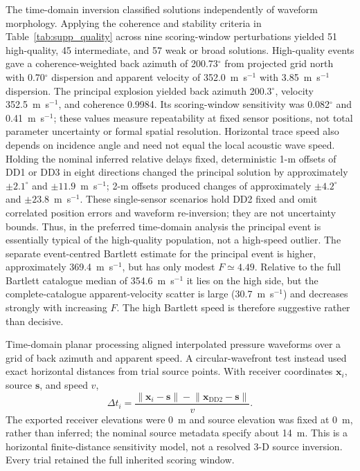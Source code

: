 \documentclass[]{seismica}
\begin{document}
The time-domain inversion classified solutions independently of waveform
morphology. Applying the coherence and stability criteria in
Table~\ref{tab:supp_quality} across nine scoring-window perturbations yielded
51 high-quality, 45 intermediate, and 57 weak or broad solutions. High-quality events gave a
coherence-weighted back azimuth of 200.73$^\circ$ from projected grid north with 0.70$^\circ$
dispersion and apparent velocity of 352.0~m~s$^{-1}$ with
3.85~m~s$^{-1}$ dispersion. The principal explosion yielded back azimuth
200.3$^\circ$, velocity 352.5~m~s$^{-1}$, and coherence 0.9984. Its scoring-window sensitivity was 0.082$^\circ$ and 0.41~m~s$^{-1}$; these values
measure repeatability at fixed sensor positions, not total parameter uncertainty
or formal spatial resolution. Horizontal trace speed also depends on
incidence angle and need not equal the local acoustic wave speed. Holding the nominal inferred relative delays
fixed, deterministic 1-m offsets of DD1 or DD3 in eight directions changed
the principal solution by approximately $\pm2.1^\circ$ and $\pm11.9$~m~s$^{-1}$;
2-m offsets produced changes of approximately $\pm4.2^\circ$ and
$\pm23.8$~m~s$^{-1}$. These single-sensor scenarios hold DD2 fixed and omit
correlated position errors and waveform re-inversion; they are not uncertainty
bounds. Thus, in the preferred
time-domain analysis the principal event is essentially typical of the
high-quality population, not a high-speed outlier.
The separate event-centred Bartlett estimate for the principal event is
higher, approximately 369.4~m~s$^{-1}$, but has only modest $F\simeq4.49$.
Relative to the full Bartlett catalogue median of 354.6~m~s$^{-1}$ it lies on
the high side, but the complete-catalogue apparent-velocity scatter is large
(30.7~m~s$^{-1}$) and decreases strongly with increasing $F$. The high Bartlett
speed is therefore suggestive rather than decisive.

Time-domain planar processing aligned interpolated pressure waveforms over a
grid of back azimuth and apparent speed. A circular-wavefront test instead
used exact horizontal distances from trial source points. With receiver
coordinates $\mathbf{x}_i$, source $\mathbf{s}$, and speed $v$,
\begin{equation}
 \Delta t_i=\frac{\lVert\mathbf{x}_i-\mathbf{s}\rVert-
 \lVert\mathbf{x}_{\mathrm{DD2}}-\mathbf{s}\rVert}{v}.
\end{equation}
The exported receiver elevations were 0~m and source elevation was fixed at
0~m, rather than inferred; the nominal source metadata specify about 14~m.
This is a horizontal finite-distance sensitivity model, not a resolved 3-D
source inversion. Every trial retained the full inherited scoring window.
\end{document}
